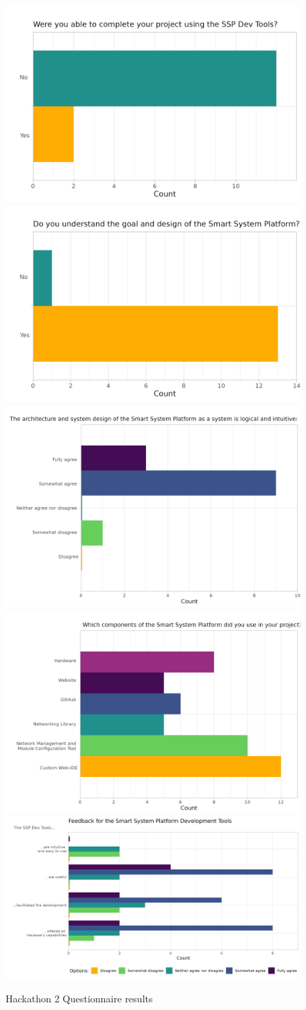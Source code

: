 \begin{figure}[H]
    \centering
    \includegraphics[width=.4\linewidth]{rstudio/survey/plots/completion.png}
    \includegraphics[width=.4\linewidth]{rstudio/survey/plots/logic.png}
    \includegraphics[width=.49\linewidth]{rstudio/survey/plots/architecture.png}
    \includegraphics[width=.49\linewidth]{rstudio/survey/plots/component.png}\\


    \includegraphics[height=.3\linewidth]{rstudio/survey/plots/ssp2.png}
    \vspace{\ftspace}
    \caption{Hackathon 2 Questionnaire results}
    \vspace{\ftspace}
    \label{fig:hack2_questions}
\end{figure}

